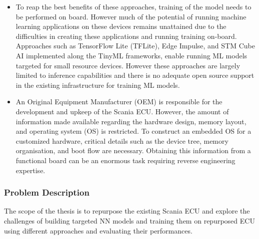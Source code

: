\begin{itemize}
	\item To reap the best benefits of these approaches, training of the model needs to be performed on board. However much of the potential of running machine learning applications on these devices remains unattained due to the difficulties in creating these applications and running training on-board. Approaches such as TensorFlow Lite (TFLite), Edge Impulse, and STM Cube AI implemented along the TinyML frameworks, enable running ML models targeted for small resource devices. However these approaches are largely limited to inference capabilities and there is no adequate open source support in the existing infrastructure for training ML models.
	\item An Original Equipment Manufacturer (OEM) is responsible for the development and upkeep of the Scania ECU. However, the amount of information made available regarding the hardware design, memory layout, and operating system (OS) is restricted. To construct an embedded OS for a customized hardware, critical details such as the device tree, memory organisation, and boot flow are necessary. Obtaining this information from a functional board can be an enormous task requiring reverse engineering expertise.
\end{itemize}




\subsubsection{Problem Description}
The scope of the thesis is to repurpose the existing Scania ECU and explore the challenges of building targeted NN models and training them on repurposed ECU using different approaches and evaluating their performances.

